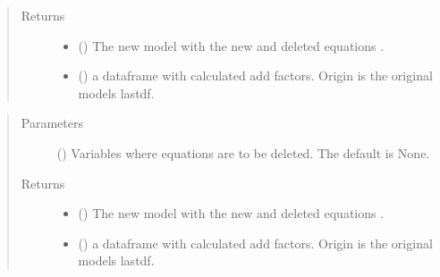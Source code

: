 \documentclass[letterpaper,10pt,english]{sphinxmanual}
\begin{document}
\begin{fulllineitems}
\begin{fulllineitems}
\begin{quote}
\begin{description}
\begin{itemize}
\end{itemize}

\item[{Returns}] \leavevmode
\sphinxAtStartPar
\begin{itemize}
\item {} 
\sphinxAtStartPar
{} () \textendash{} The new  model with the new and deleted equations .

\item {} 
\sphinxAtStartPar
{} () \textendash{} a dataframe with calculated add factors. Origin is the original models lastdf.

\end{itemize}


\end{description}\end{quote}

\end{fulllineitems}


\begin{fulllineitems}
\label{\detokenize{core/modelclass:modelclass.Modify_Mixin.eqdelete}}
\pysigstartsignatures
{}
\pysigstopsignatures\begin{quote}\begin{description}
\item[{Parameters}] \leavevmode
\sphinxAtStartPar
{} (\sphinxstyleliteralemphasis{\sphinxupquote{, }}) \textendash{} Variables where equations are to be deleted. The default is None.

\item[{Returns}] \leavevmode
\sphinxAtStartPar
\begin{itemize}
\item {} 
\sphinxAtStartPar
{} () \textendash{} The new  model with the new and deleted equations .

\item {} 
\sphinxAtStartPar
{} () \textendash{} a dataframe with calculated add factors. Origin is the original models lastdf.


\end{itemize}
\end{description}
\end{quote}
\end{fulllineitems}
\end{fulllineitems}
\end{document}

